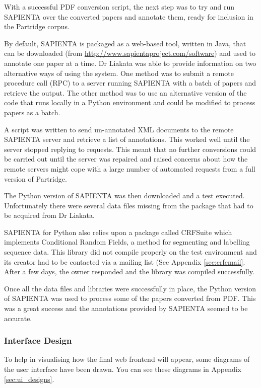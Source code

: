 \documentclass[12pt,a4paper]{article}
\begin{document}
With a successful PDF conversion script, the next step was to try and run
SAPIENTA over the converted papers and annotate them, ready for inclusion in
the Partridge corpus.

By default, SAPIENTA is packaged as a web-based tool, written in Java, that
can be downloaded (from \url{http://www.sapientaproject.com/software}) and used
to annotate one paper at a time. Dr Liakata was able to provide information on
two alternative ways of using the system. One method was to submit a remote
procedure call (RPC) to a server running SAPIENTA with a batch of papers and
retrieve the output. The other method was to use an alternative version of the
code that runs locally in a Python environment and could be modified to process
papers as a batch.

A script was written to send un-annotated XML documents to the remote SAPIENTA
server and retrieve a list of annotations. This worked well until the server
stopped replying to requests. This meant that no further conversions could be
carried out until the server was repaired and raised concerns about how the
remote servers might cope with a large number of automated requests from a
full version of Partridge.

The Python version of SAPIENTA was then downloaded and a test executed.
Unfortunately there were several data files missing from the package that had
to be acquired from Dr Liakata. 

SAPIENTA for Python also relies upon a package called CRFSuite which implements
Conditional Random Fields, a method for segmenting and labelling sequence
data\cite{CRFsuite}. This library did not compile properly on the test
environment and its creator had to be contacted via a mailing list (See
Appendix \ref{sec:crfemail}. After a few days, the owner responded and the
library was compiled successfully.  

Once all the data files and libraries were successfully in place, the Python
version of SAPIENTA was used to process some of the papers converted from PDF.
This was a great success and the annotations provided by SAPIENTA seemed to be
accurate. 

\subsubsection{Interface Design}

To help in visualising how the final web frontend will appear, some diagrams of
the user interface have been drawn. You can see these diagrams in Appendix
\ref{sec:ui_designs}. 
\end{document}
